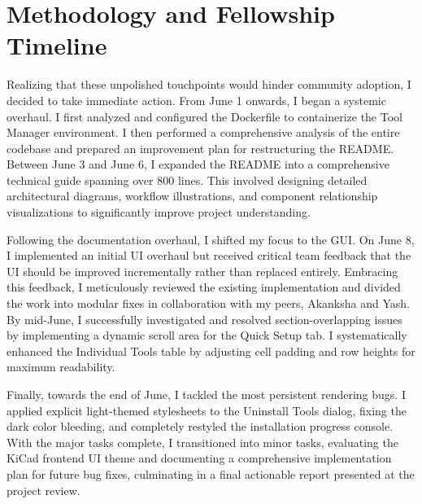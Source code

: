 \documentclass[12pt,a4paper]{report}
\begin{document}
\section{Methodology and Fellowship Timeline}
Realizing that these unpolished touchpoints would hinder community adoption, I decided to take immediate action. From June 1 onwards, I began a systemic overhaul. I first analyzed and configured the Dockerfile to containerize the Tool Manager environment. I then performed a comprehensive analysis of the entire codebase and prepared an improvement plan for restructuring the README. Between June 3 and June 6, I expanded the README into a comprehensive technical guide spanning over 800 lines. This involved designing detailed architectural diagrams, workflow illustrations, and component relationship visualizations to significantly improve project understanding.

Following the documentation overhaul, I shifted my focus to the GUI. On June 8, I implemented an initial UI overhaul but received critical team feedback that the UI should be improved incrementally rather than replaced entirely. Embracing this feedback, I meticulously reviewed the existing implementation and divided the work into modular fixes in collaboration with my peers, Akanksha and Yash. By mid-June, I successfully investigated and resolved section-overlapping issues by implementing a dynamic scroll area for the Quick Setup tab. I systematically enhanced the Individual Tools table by adjusting cell padding and row heights for maximum readability. 

Finally, towards the end of June, I tackled the most persistent rendering bugs. I applied explicit light-themed stylesheets to the Uninstall Tools dialog, fixing the dark color bleeding, and completely restyled the installation progress console. With the major tasks complete, I transitioned into minor tasks, evaluating the KiCad frontend UI theme and documenting a comprehensive implementation plan for future bug fixes, culminating in a final actionable report presented at the project review.
\end{document}
